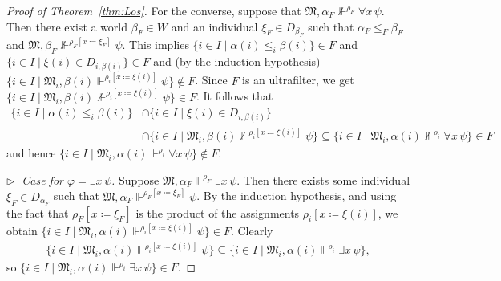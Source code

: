 \documentclass[10pt,a4paper]{amsart}
\newcommand{\mo}{\mathfrak}
\newcommand{\notsatisfy}[4]{#1, #2 \not\Vdash^{#4} #3}
\newcommand{\satisfySym}{\Vdash}
\newcommand{\satisfy}[4]{#1, #2 \satisfySym^{#4} #3}
\renewcommand{\phi}{\varphi}
\begin{document}
\begin{proof}[Proof of Theorem~\ref{thm:Los}]
    For the converse, suppose that $\notsatisfy{\mo{M}}{\alpha_F}{\forall x\, \psi}{\rho_F}$. 
    Then there exist a world $\beta_F \in W$ and an individual $\xi_F \in D_{\beta_F}$
    such that $\alpha_F \leq_F \beta_F$
    and $\notsatisfy{\mo{M}}{\beta_F}{\psi}{\rho_F[x \coloneq \xi_F]}$. 
    This implies $\{ i \in I \mid \alpha(i) \leq_i \beta(i) \} \in F$
    and $\{ i \in I \mid \xi(i) \in D_{i,\beta(i)}\} \in F$
    and (by the induction hypothesis)
    $\{ i \in I \mid \satisfy{\mo{M}_i}{\beta(i)}{\psi}{\rho_i[x \coloneq \xi(i)]} \} \notin F$.
    Since $F$ is an ultrafilter, we get
    $\{ i \in I \mid \notsatisfy{\mo{M}_i}{\beta(i)}{\psi}{\rho_i[x \coloneq \xi(i)]} \} \in F$.
    It follows that
    \begin{align*}
      \{ i \in I \mid \alpha(i) \leq_i \beta(i) \}
        &\cap \{ i \in I \mid \xi(i) \in D_{i,\beta(i)} \} \\
        &\cap \{ i \in I \mid \notsatisfy{\mo{M}_i}{\beta(i)}{\psi}{\rho_i[x \coloneq \xi(i)]} \} 
         \subseteq \{ i \in I \mid \notsatisfy{\mo{M}_i}{\alpha(i)}{\forall x\,\psi}{\rho_i}\} \in F
    \end{align*}
    and hence $\{ i \in I \mid \satisfy{\mo{M}_i}{\alpha(i)}{\forall x\,\psi}{\rho_i} \} \notin F$.
    
  \medskip\noindent
  \textit{$\triangleright\;$ Case for $\phi = \exists x\,\psi$.}
    Suppose $\satisfy{\mo{M}}{\alpha_F}{\exists x\,\psi}{\rho_F}$.
    Then there exists some individual $\xi_F \in D_{\alpha_F}$ such that
    $\satisfy{\mo{M}}{\alpha_F}{\psi}{\rho_F[x \coloneq \xi_F]}$.
    By the induction hypothesis, and using the fact that
    $\rho_F[x \coloneq \xi_F]$ is the product of the assignments $\rho_i[x \coloneq \xi(i)]$,
    we obtain
    $\{ i \in I \mid \satisfy{\mo{M}_i}{\alpha(i)}{\psi}{\rho_i[x \coloneq \xi(i)]} \} \in F$.
    Clearly
    \begin{align*}
      \{ i \in I \mid \satisfy{\mo{M}_i}{\alpha(i)}{\psi}{\rho_i[x \coloneq \xi(i)]}\}
        \subseteq \{ i \in I \mid \satisfy{\mo{M}_i}{\alpha(i)}{\exists x\,\psi}{\rho_i} \},
    \end{align*}
    so $\{ i \in I \mid \satisfy{\mo{M}_i}{\alpha(i)}{\exists x\, \psi}{\rho_i} \} \in F$.
  

\end{proof}
\end{document}

